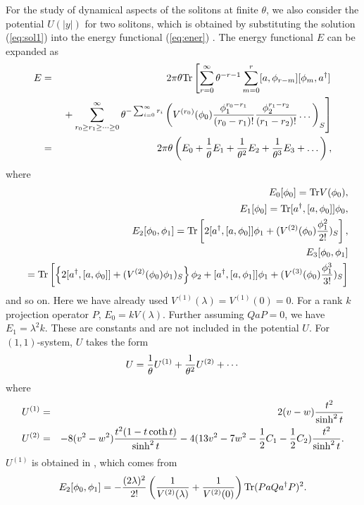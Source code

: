 \documentclass[a4paper,12pt]{article}
\begin{document}
For the study of dynamical aspects of the solitons at finite $\theta$,
we also consider the potential $U(|y|)$ for two solitons, which is
obtained by substituting the solution (\ref{eq:sol1}) into the energy
functional (\ref{eq:ener}) \cite{GHS,HLRU}.
The energy functional $E$ can be expanded as
\begin{eqnarray}
E&=&2\pi\theta{\rm Tr}\left[
 \sum_{r=0}^\infty\theta^{-r-1}\sum_{m=0}^r
 [a,\phi_{r-m}][\phi_m,a^\dagger]
 \right.\nonumber\\
&&\left.{}
 +\sum_{r_0\ge r_1\ge\dots\ge0}^{\infty}
 \theta^{-\sum_{i=0}^\infty r_i}
 \left(V^{(r_0)}(\phi_0){\phi_1^{r_0-r_1}\over(r_0-r_1)!}
 {\phi_2^{r_1-r_2}\over(r_1-r_2)!}\dots\right)_S
 \right]
\nonumber\\
&=&2\pi\theta \left(E_0+{1\over\theta}E_1
 +{1\over\theta^{2}}E_2+{1\over\theta^{3}}E_3+\dots\right),
\label{eq:expanded_e}
\end{eqnarray}
where
\begin{eqnarray}
&&E_0[\phi_0]={\rm Tr} V(\phi_0), \nonumber\\
&&E_1[\phi_0]={\rm Tr}[a^\dagger ,[a,\phi_0]]\phi_0, \nonumber\\
&&E_2[\phi_0,\phi_1]
 ={\rm Tr}\left[2[a^\dagger ,[a,\phi_0]]\phi_1
 +(V^{(2)}(\phi_0){\phi_1^2\over 2!})_S\right], \nonumber\\
&&E_3[\phi_0,\phi_1]\nonumber\\
&& ={\rm Tr}\left[
 \left\{2[a^\dagger ,[a,\phi_0]]
 +(V^{(2)}(\phi_0)\phi_1)_S\right\}\phi_2
 +[a^\dagger ,[a,\phi_1]]\phi_1
 +(V^{(3)}(\phi_0){\phi_1^3\over 3!})_S\right]
\label{eq:energies}
\end{eqnarray}
and so on.
Here we have already used $V^{(1)}(\lambda)=V^{(1)}(0)=0$.
For a rank $k$ projection operator $P$, $E_0=kV(\lambda)$.
Further assuming $QaP=0$, we have $E_1=\lambda^2 k$.
These are constants and are not included in the potential $U$.
For $(1,1)$-system, $U$ takes the form
\begin{equation}
 U={1\over\theta} U^{(1)}+{1\over \theta^2} U^{(2)}+\cdots
\end{equation}
where
\begin{eqnarray}
 U^{(1)}&=& 2(v-w){t^2\over\sinh^2 t }\nonumber\\
 U^{(2)}&=& -8 (v^2-w^2) {t^2(1-t\coth t)\over \sinh^2 t}
-4 (13v^2-7w^2-{1\over2}C_{1}-{1\over2}C_{2}) {t^2\over \sinh^2 t}.
\end{eqnarray}
$U^{(1)}$ is obtained in \cite{HLRU},
which comes from
\begin{equation}
E_2[\phi_0,\phi_1]
 =-{(2\lambda)^2\over2!}\left({1\over V^{(2)}(\lambda)}
 +{1\over V^{(2)}(0)}\right)
 {\rm Tr} ( P  a Q a^\dagger  P )^2 .
\label{eq:e2b}
\end{equation}
\end{document}
